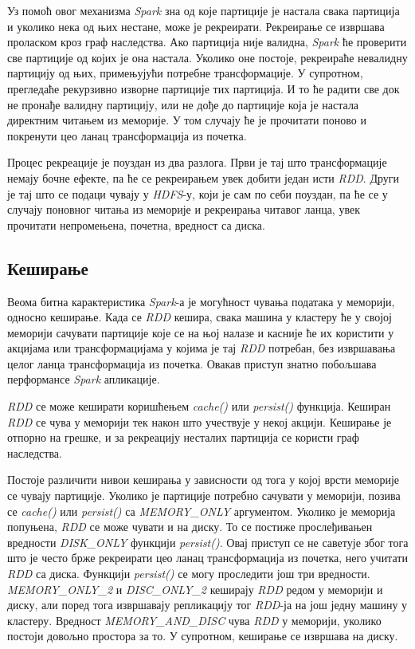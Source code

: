 \documentclass[12pt,oneside]{memoir}
\begin{document}
Уз помоћ овог механизма \textit{Spark} зна од које партиције је настала свака партиција и уколико нека од њих нестане, може је рекреирати. Рекреирање се извршава проласком кроз граф наследства. Ако партиција није валидна, \textit{Spark} ће проверити све партиције од којих је она настала. Уколико оне постоје, рекреираће невалидну партицију од њих, примењујући потребне трансформације. У супротном, прегледаће рекурзивно изворне партиције тих партиција. И то ће радити све док не пронађе валидну партицију, или не дође до партиције која је настала директним читањем из меморије. У том случају ће је прочитати поново и покренути цео ланац трансформација из почетка. \cite{hadoop_learning}

Процес рекреације је поуздан из два разлога. Први је тај што трансформације немају бочне ефекте, па ће се рекреирањем увек добити један исти \textit{RDD}. Други је тај што се подаци чувају у \textit{HDFS}-у, који је сам по себи поуздан, па ће се у случају поновног читања из меморије и рекреирања читавог ланца, увек прочитати непромењена, почетна, вредност са диска.

\subsection{Кеширање}
\label{subsec:spark_persist}

Веома битна карактеристика \textit{Spark}-а је могућност чувања података у меморији, односно кеширање. Када се \textit{RDD} кешира, свака машина у кластеру ће у својој меморији сачувати партиције које се на њој налазе и касније ће их користити у акцијама или трансформацијама у којима је тај \textit{RDD} потребан, без извршавања целог ланца трансформација из почетка. Овакав приступ знатно побољшава перформансе \textit{Spark} апликације. \cite{spark_rdd}

\textit{RDD} се може кеширати коришћењем \textit{cache()} или \textit{persist()} функција. Кеширан \textit{RDD} се чува у меморији тек након што учествује у некој акцији. Кеширање је отпорно на грешке, и за рекреацију несталих партиција се користи граф наследства. \cite{spark_rdd}

Постоје различити нивои кеширања у зависности од тога у којој врсти меморије се чувају партиције. Уколико је партиције потребно сачувати у меморији, позива се \textit{cache()} или \textit{persist()} са \textit{MEMORY\_ONLY} аргументом. Уколико је меморија попуњена, \textit{RDD} се може чувати и на диску. То се постиже прослеђивањен вредности \textit{DISK\_ONLY} функцији \textit{persist()}. Овај приступ се не саветује због тога што је често брже рекреирати цео ланац трансформација из почетка, него учитати \textit{RDD} са диска. Функцији \textit{persist()} се могу проследити још три вредности. \textit{MEMORY\_ONLY\_2} и \textit{DISC\_ONLY\_2} кеширају \textit{RDD} редом у меморији и диску, али поред тога извршавају репликацију тог \textit{RDD}-ја на још једну машину у кластеру. Вредност \textit{MEMORY\_AND\_DISC} чува \textit{RDD} у меморији, уколико постоји довољно простора за то. У супротном, кеширање се извршава на диску. \cite{spark_rdd}
\end{document}
